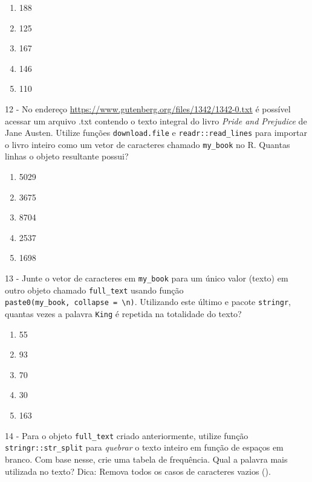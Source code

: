\documentclass[
  11pt,
]{book}
\providecommand{\tightlist}{%
  \setlength{\itemsep}{0pt}\setlength{\parskip}{0pt}}
\begin{document}
\begin{enumerate}
\def\labelenumi{\alph{enumi})}
\tightlist
\item
  188
\item
  125
\item
  167
\item
  146
\item
  110
\end{enumerate}

12 -
No endereço \url{https://www.gutenberg.org/files/1342/1342-0.txt} é possível acessar um arquivo .txt contendo o texto integral do livro \emph{Pride and Prejudice} de Jane Austen. Utilize funções \texttt{download.file} e \texttt{readr::read\_lines} para importar o livro inteiro como um vetor de caracteres chamado \texttt{my\_book} no R. Quantas linhas o objeto resultante possui?

\begin{enumerate}
\def\labelenumi{\alph{enumi})}
\tightlist
\item
  5029
\item
  3675
\item
  8704
\item
  2537
\item
  1698
\end{enumerate}

13 -
Junte o vetor de caracteres em \texttt{my\_book} para um único valor (texto) em outro objeto chamado \texttt{full\_text} usando função \texttt{paste0(my\_book,\ collapse\ =\ \textquotesingle{}\textbackslash{}n\textquotesingle{})}. Utilizando este último e pacote \texttt{stringr}, quantas vezes a palavra \texttt{\textquotesingle{}King\textquotesingle{}} é repetida na totalidade do texto?

\begin{enumerate}
\def\labelenumi{\alph{enumi})}
\tightlist
\item
  55
\item
  93
\item
  70
\item
  30
\item
  163
\end{enumerate}

14 -
Para o objeto \texttt{full\_text} criado anteriormente, utilize função \texttt{stringr::str\_split} para \emph{quebrar} o texto inteiro em função de espaços em branco. Com base nesse, crie uma tabela de frequência. Qual a palavra mais utilizada no texto? Dica: Remova todos os casos de caracteres vazios (\texttt{\textquotesingle{}\textquotesingle{}}).
\end{document}
